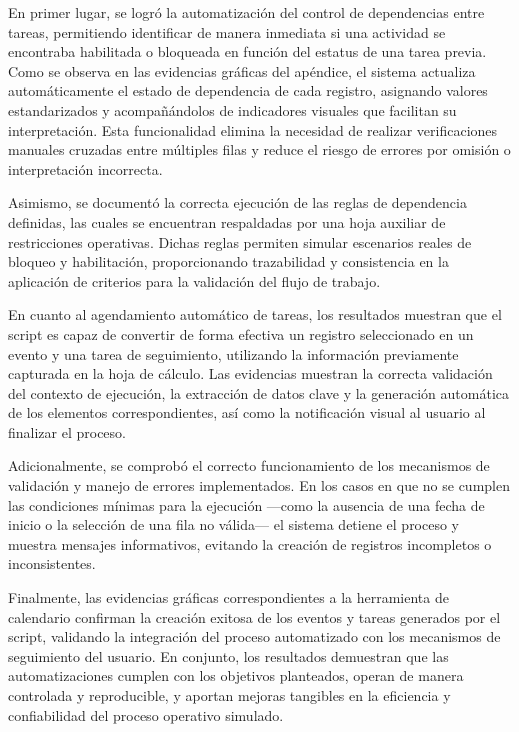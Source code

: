 \documentclass[12pt]{article}
\begin{document}
En primer lugar, se logró la automatización del control de dependencias entre tareas, permitiendo identificar de manera inmediata si una actividad se encontraba habilitada o bloqueada en función del estatus de una tarea previa. Como se observa en las evidencias gráficas del apéndice, el sistema actualiza automáticamente el estado de dependencia de cada registro, asignando valores estandarizados y acompañándolos de indicadores visuales que facilitan su interpretación. Esta funcionalidad elimina la necesidad de realizar verificaciones manuales cruzadas entre múltiples filas y reduce el riesgo de errores por omisión o interpretación incorrecta.

Asimismo, se documentó la correcta ejecución de las reglas de dependencia definidas, las cuales se encuentran respaldadas por una hoja auxiliar de restricciones operativas. Dichas reglas permiten simular escenarios reales de bloqueo y habilitación, proporcionando trazabilidad y consistencia en la aplicación de criterios para la validación del flujo de trabajo.

En cuanto al agendamiento automático de tareas, los resultados muestran que el script es capaz de convertir de forma efectiva un registro seleccionado en un evento y una tarea de seguimiento, utilizando la información previamente capturada en la hoja de cálculo. Las evidencias muestran la correcta validación del contexto de ejecución, la extracción de datos clave y la generación automática de los elementos correspondientes, así como la notificación visual al usuario al finalizar el proceso.

Adicionalmente, se comprobó el correcto funcionamiento de los mecanismos de validación y manejo de errores implementados. En los casos en que no se cumplen las condiciones mínimas para la ejecución —como la ausencia de una fecha de inicio o la selección de una fila no válida— el sistema detiene el proceso y muestra mensajes informativos, evitando la creación de registros incompletos o inconsistentes.

Finalmente, las evidencias gráficas correspondientes a la herramienta de calendario confirman la creación exitosa de los eventos y tareas generados por el script, validando la integración del proceso automatizado con los mecanismos de seguimiento del usuario. En conjunto, los resultados demuestran que las automatizaciones cumplen con los objetivos planteados, operan de manera controlada y reproducible, y aportan mejoras tangibles en la eficiencia y confiabilidad del proceso operativo simulado.
\end{document}
